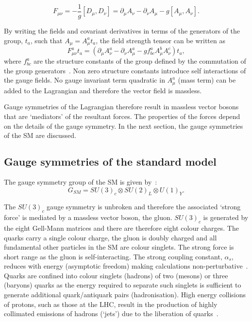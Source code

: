 \begin{equation}
F_{\mu\nu} = - \frac{1}{g}\left[D_{\mu},D_{\nu}\right] = \partial_{\mu}A_{\nu} - \partial_{\nu} A_{\mu} - g\left[A_{\mu},A_{\nu}\right].
\end{equation}

By writing the fields and covariant derivatives in terms of the generators of the group, $t_{a}$, such
that $A_{\mu} = A^{a}_{\mu} t_{a}$, the field strength tensor can be written as 
\begin{equation}
F^{a}_{\mu\nu}t_{a} = \left(\partial_{\mu}A^{a}_{\nu} - \partial_{\nu} A^{a}_{\mu} - g f_{bc}^{a}A^b_{\mu}A^c_{\nu}\right)t_a,
\end{equation}
where $f_{bc}^{a}$ are the structure constants of the group defined by the 
commutation of the group generators~\cite{wei1963lie}. Non zero structure constants introduce
self interactions of the gauge fields. No gauge invariant term quadratic 
in $A^a_\mu$ (mass term) can be added to the Lagrangian and 
therefore the vector field is massless.

Gauge symmetries of the Lagrangian therefore result in massless vector 
bosons that are `mediators' of the resultant forces. The properties of
the forces depend on the details of the gauge symmetry. 
In the next section, the gauge symmetries
of the SM are discussed. 

\subsection{Gauge symmetries of the standard model}
\label{sec:sm-gs}
The gauge symmetry group of the SM is given by~\cite{ewk-int}:
\begin{equation}
G_{SM} = SU(3)_{c}\otimes SU(2)_{L}\otimes U(1)_{Y}.
\end{equation}

The $SU(3)_c$ gauge symmetry is unbroken and therefore the associated
`strong force' is mediated by a massless vector boson, the gluon.
$SU(3)_c$ is generated by the eight Gell-Mann matrices and there are therefore eight colour charges. 
The quarks carry a single colour charge, the gluon is doubly charged and all fundamental 
other particles in the SM are colour singlets. The strong force is short range
as the gluon is self-interacting.  The strong coupling constant, $\alpha_s$, 
reduces with energy (asymptotic freedom)
making calculations non-perturbative~\cite{qcd}. Quarks
are confined into colour singlets (hadrons)
of two (mesons) or three (baryons) quarks 
as the energy required to separate such singlets is 
sufficient to generate additional quark/antiquark pairs (hadronisation). 
High energy collisions of protons, 
such as those at the LHC, result in the production of highly 
collimated emissions of hadrons (`jets') due to the 
liberation of quarks~\cite{salam}.


